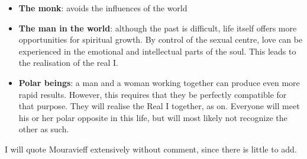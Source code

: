 \begin{itemize}
\item \textbf{The monk}: avoids the influences of the world 
\item \textbf{The man in the world}: although the past is difficult, life itself offers more opportunities for spiritual growth. By control of the sexual centre, love can be experienced in the emotional and intellectual parts of the soul. This leads to the realisation of the real I. 
\item \textbf{Polar beings}: a man and a woman working together can produce even more rapid results. However, this requires that they be perfectly compatible for that purpose. They will realise the Real I together, as on. Everyone will meet his or her polar opposite in this life, but will most likely not recognize the other as such. 
\end{itemize}
I will quote Mouravieff extensively without comment, since there is little to add.

